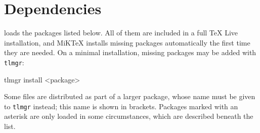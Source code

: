 \chapter{Dependencies}\label{C:Dependencies}

	\rpgtex{} loads the packages listed below. All of them are included in a full TeX Live installation, and MiKTeX installs missing packages automatically the first time they are needed. On a minimal installation, missing packages may be added with \texttt{tlmgr}:
	\begin{BashBlock}
		tlmgr install <package>
	\end{BashBlock}
	Some files are distributed as part of a larger package, whose name must be given to \texttt{tlmgr} instead; this name is shown in brackets. Packages marked with an asterisk are only loaded in some circumstances, which are described beneath the list.


